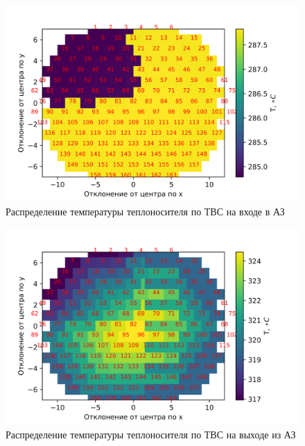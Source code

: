 \begin{figure}[H]
	\begin{center}
		\includegraphics{treton_one_gcn_t_all_cells_z_is_0.png}
		\caption{Распределение температуры теплоносителя по ТВС на входе в АЗ}
		\label{pic:treton-one-gcn-t-all-cells-is-0} %
	\end{center}
\end{figure}

\begin{figure}[H]
	\begin{center}
		\includegraphics{treton_one_gcn_t_all_cells_z_is_29.png}
		\caption{Распределение температуры теплоносителя по ТВС на выходе из АЗ}
		\label{pic:treton-one-gcn-t-all-cells-is-29}
	\end{center}
\end{figure}

